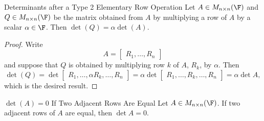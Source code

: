 \documentclass[linearalgebraI]{subfiles}
\begin{document}
    \begin{cor}{Determinants after a Type 2 Elementary Row Operation}
        Let $A\in M_{n\times n}(\F)$ and $Q\in M_{n\times n}(\F)$ be the matrix obtained from $A$ by multiplying a row of $A$ by a scalar $\alpha\in \F$. Then $\det(Q) = \alpha\det(A)$.
    \end{cor}	

    \begin{proof}
        Write
        \begin{equation*}
            A = 
            \begin{bmatrix}
                R_1, \ldots, R_n
            \end{bmatrix}
        \end{equation*}
        and suppose that $Q$ is obtained by multiplying row $k$ of $A$, $R_k$, by $\alpha$. Then
        \begin{equation*}
            \det(Q) = 
            \det 
            \begin{bmatrix}
                R_1, \ldots, \alpha R_k, \ldots, R_n
            \end{bmatrix}
            = 
            \alpha \det 
            \begin{bmatrix}
                R_1, \ldots, R_k, \ldots, R_n
            \end{bmatrix}
            = \alpha \det A,
        \end{equation*}
        which is the desired result.
    \end{proof}

    \begin{lemma}{$\det(A) = 0$ If Two Adjacent Rows Are Equal}
        Let $A\in M_{n\times n}(\F)$. If two adjacent rows of $A$ are equal, then $\det A = 0$.
    \end{lemma}
\end{document}
